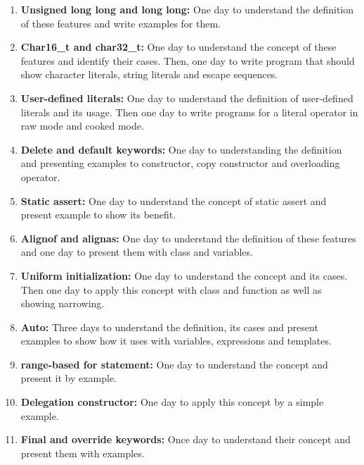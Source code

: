 \documentclass[11pt,]{report}
\begin{document}
\begin{enumerate}
\item \textbf{Unsigned long long and long long:} One day to understand the \linebreak definition of these features and write examples for them.

\item \textbf{Char16\_t and char32\_t:} One day to understand the concept of these features and identify their cases. Then, one day to write program that should show character literals, string literals  and escape sequences.

\item \textbf{User-defined literals:} One day to understand the definition of \linebreak user-defined literals and its usage. Then one day to write programs for a literal operator in raw mode  and cooked mode.

\item \textbf{Delete and default keywords:} One day to understanding the definition and presenting examples to constructor, copy constructor and overloading operator.

\item \textbf{Static assert:} One day to understand the concept of static assert and present example to show its benefit.

\item \textbf{Alignof and alignas:} One day to understand the definition of these features and one day to present them with class and variables.

\item \textbf{Uniform initialization:} One day to understand the concept and its cases. Then one day to apply this concept with class and function as well as showing narrowing.

\item \textbf{Auto:} Three days to understand the definition, its cases and present examples to show how it uses with variables, expressions and templates.

\item  \textbf{range-based for statement:} One day to understand the concept and present it by example.

\item \textbf{Delegation constructor:} One day to apply this concept by a simple example.

\item \textbf{Final and override keywords:} Once day to understand their concept and present them with examples.


\end{enumerate}
\end{document}
